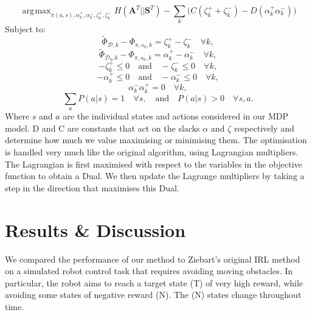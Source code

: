 \documentclass[conference]{IEEEtran}
\DeclareMathOperator*{\argmax}{\arg\!\max}
\begin{document}
	\begin{equation*}
	\argmax_{\pi(a,s),\alpha^+_k ,\alpha^-_k ,\zeta^+_k, \zeta^-_k} H(\mathbf{A}^T||\mathbf{S}^T) - \sum_k\big(C(\zeta^+_k + \zeta^-_k)  -D(\alpha^+_k  \alpha^-_k)\big)
\end{equation*}
Subject to:
\begin{equation*}
  \widetilde{\Phi}_{\mathcal{D},k}-\Phi_{\pi,s_0,k}   = \zeta^+_k  - \zeta^-_k \quad \forall k, \label{eq:good_ineq}
\end{equation*}
\begin{equation*}
	\widetilde{\Phi}_{\mathcal{D}_b,k}-\Phi_{\pi,s_0,k}  = \alpha^+_k-\alpha^-_k \quad \forall k, \label{eq:bad_ineq}
\end{equation*}
\begin{equation*}
	-\zeta^+_k \leq 0 \quad \text{and} \quad -\zeta^-_k \leq 0 \quad \forall k,
\end{equation*}
\begin{equation*}
	-\alpha^+_k \leq 0 \quad \text{and} \quad -\alpha^-_k \leq 0 \quad \forall k,
\end{equation*}
\begin{equation*}
	\alpha^-_k \alpha^+_k = 0 \quad \forall k,  \label{eq:quadratic}
\end{equation*}
\begin{equation*}
\sum_aP(a|s)  = 1 \quad \forall s,   \quad \text{and} \quad P(a|s)  > 0 \quad \forall s,a.  
\end{equation*}
Where $s$ and $a$ are the individual states and actions considered in our MDP model. D and C are constants that act on the slacks $\alpha$ and $\zeta$ respectively and determine how much we value maximising or minimising them. The optimisation is handled very much like the original algorithm, using Lagrangian multipliers. The Lagrangian is first maximised with respect to the variables in the objective function to obtain a Dual. We then update the Lagrange multipliers by taking a step in the direction that maximises this Dual.

\section{Results \& Discussion}

We compared the performance of our method to Ziebart's original IRL method on a simulated robot control task that requires avoiding moving obstacles.  In particular, the robot aims to reach a target state (T) of very high reward,
while avoiding some states of negative reward (N). The (N) states change throughout time.
 
\end{document}
